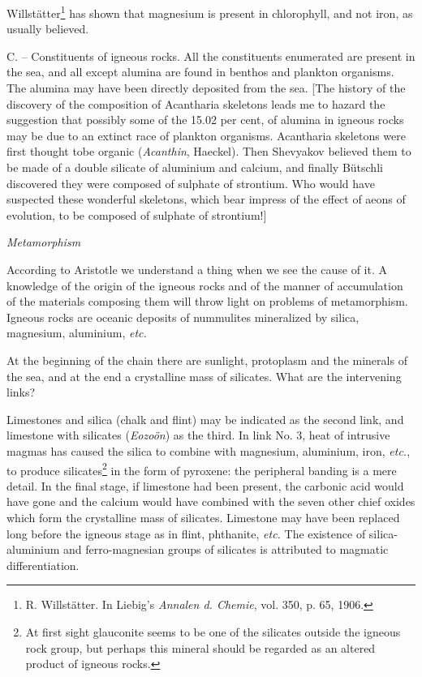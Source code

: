 \documentclass[a4paper, 12pt, oneside]{article}
\begin{document}
Willstätter\footnote{R. Willstätter. In Liebig's \emph{Annalen d. Chemie}, vol. 350, p. 65, 1906.} has shown that magnesium is present in chlorophyll, and not iron, as usually believed.

C. -- Constituents of igneous rocks. All the constituents enumerated are present in the sea, and all except alumina are found in benthos and plankton organisms. The alumina may have been directly deposited from the sea. [The history of the discovery of the composition of Acantharia skeletons leads me to hazard the suggestion that possibly some of the 15.02 per cent, of alumina in igneous rocks may be due to an extinct race of plankton organisms. Acantharia skeletons were first thought tobe organic (\emph{Acanthin}, Haeckel). Then Shevyakov believed them to be made of a double silicate of aluminium and calcium, and finally Bütschli discovered they were composed of sulphate of strontium. Who would have suspected these wonderful skeletons, which bear impress of the effect of aeons of evolution, to be composed of sulphate of strontium!]

\emph{Metamorphism}

According to Aristotle we understand a thing when we see the cause of it. A knowledge of the origin of the igneous rocks and of the manner of accumulation of the materials composing them will throw light on problems of metamorphism. Igneous rocks are oceanic deposits of nummulites mineralized by silica, magnesium, aluminium, \emph{etc.}

At the beginning of the chain there are sunlight, protoplasm and the minerals of the sea, and at the end a crystalline mass of silicates. What are the intervening links?

Limestones and silica (chalk and flint) may be indicated as the second link, and limestone with silicates (\emph{Eozoön}) as the third. In link No. 3, heat of intrusive magmas has caused the silica to combine with magnesium, aluminium, iron, \emph{etc.}, to produce silicates\footnote{At first sight glauconite seems to be one of the silicates outside the igneous rock group, but perhaps this mineral should be regarded as an altered product of igneous rocks.} in the form of pyroxene: the peripheral banding is a mere detail. In the final stage, if limestone had been present, the carbonic acid would have gone and the calcium would have combined with the seven other chief oxides which form the crystalline mass of silicates. Limestone may have been replaced long before the igneous stage as in flint, phthanite, \emph{etc.} The existence of silica-aluminium and ferro-magnesian groups of silicates is attributed to magmatic differentiation.
\end{document}
